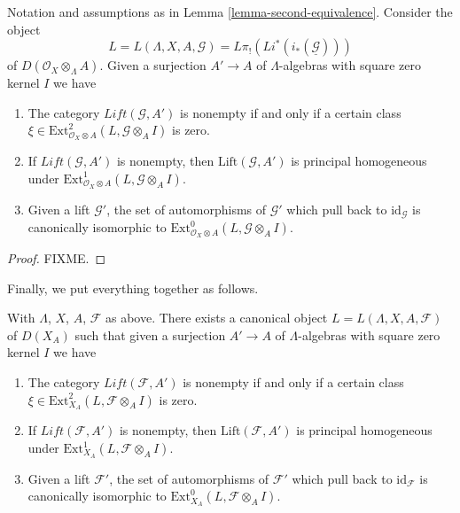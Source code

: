 \begin{lemma}
\label{lemma-second-equivalence-obs}
Notation and assumptions as in Lemma \ref{lemma-second-equivalence}.
Consider the object
$$
L = L(\Lambda, X, A, \mathcal{G}) = L\pi_!(Li^*(i_*(\underline{\mathcal{G}})))
$$
of $D(\mathcal{O}_X \otimes_\Lambda A)$. Given a surjection $A' \to A$ of
$\Lambda$-algebras with square zero kernel $I$ we have
\begin{enumerate}
\item The category $\textit{Lift}(\mathcal{G}, A')$ is nonempty
if and only if a certain class
$\xi \in \text{Ext}^2_{\mathcal{O}_X \otimes A}(L, \mathcal{G} \otimes_A I)$
is zero.
\item If $\textit{Lift}(\mathcal{G}, A')$ is nonempty, then
$\text{Lift}(\mathcal{G}, A')$ is principal homogeneous under
$\text{Ext}^1_{\mathcal{O}_X \otimes A}(L, \mathcal{G} \otimes_A I)$.
\item Given a lift $\mathcal{G}'$, the set of automorphisms of
$\mathcal{G}'$ which pull back to $\text{id}_\mathcal{G}$ is canonically
isomorphic to
$\text{Ext}^0_{\mathcal{O}_X \otimes A}(L, \mathcal{G} \otimes_A I)$.
\end{enumerate}
\end{lemma}

\begin{proof}
FIXME.
\end{proof}

\noindent
Finally, we put everything together as follows.

\begin{proposition}
\label{proposition-conclusion}
With $\Lambda$, $X$, $A$, $\mathcal{F}$ as above. There exists a canonical
object $L = L(\Lambda, X, A, \mathcal{F})$ of $D(X_A)$ such that given a
surjection $A' \to A$ of $\Lambda$-algebras with square zero kernel $I$ we
have
\begin{enumerate}
\item The category $\textit{Lift}(\mathcal{F}, A')$ is nonempty
if and only if a certain class $\xi \in \text{Ext}^2_{X_A}(L,
\mathcal{F} \otimes_A I)$ is zero.
\item If $\textit{Lift}(\mathcal{F}, A')$ is nonempty, then
$\text{Lift}(\mathcal{F}, A')$ is principal homogeneous under
$\text{Ext}^1_{X_A}(L, \mathcal{F} \otimes_A I)$.
\item Given a lift $\mathcal{F}'$, the set of automorphisms of
$\mathcal{F}'$ which pull back to $\text{id}_\mathcal{F}$ is canonically
isomorphic to
$\text{Ext}^0_{X_A}(L, \mathcal{F} \otimes_A I)$.
\end{enumerate}
\end{proposition}

